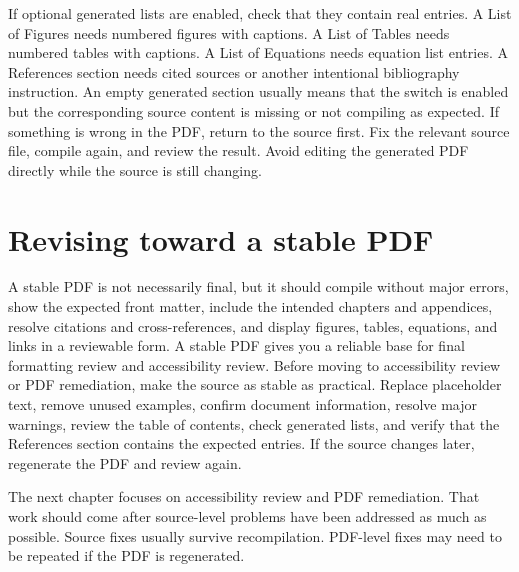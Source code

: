 If optional generated lists are enabled, check that they contain real entries. A List of Figures needs numbered figures with captions. A List of Tables needs numbered tables with captions. A List of Equations needs equation list entries. A References section needs cited sources or another intentional bibliography instruction. An empty generated section usually means that the switch is enabled but the corresponding source content is missing or not compiling as expected. If something is wrong in the PDF, return to the source first. Fix the relevant source file, compile again, and review the result. Avoid editing the generated PDF directly while the source is still changing.

\section{Revising toward a stable PDF}
\label{sec:revising-stable-pdf}

A stable PDF is not necessarily final, but it should compile without major errors, show the expected front matter, include the intended chapters and appendices, resolve citations and cross-references, and display figures, tables, equations, and links in a reviewable form. A stable PDF gives you a reliable base for final formatting review and accessibility review. Before moving to accessibility review or PDF remediation, make the source as stable as practical. Replace placeholder text, remove unused examples, confirm document information, resolve major warnings, review the table of contents, check generated lists, and verify that the References section contains the expected entries. If the source changes later, regenerate the PDF and review again.

The next chapter focuses on accessibility review and PDF remediation. That work should come after source-level problems have been addressed as much as possible. Source fixes usually survive recompilation. PDF-level fixes may need to be repeated if the PDF is regenerated.